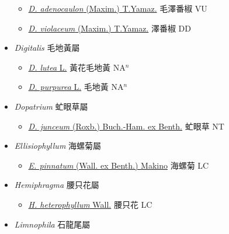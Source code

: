 \begin{itemize}
  \begin{itemize}
        \item[] \href{http://www.theplantlist.org/tpl1.1/search?q=Deinostema+adenocaulon}{\textit{D. adenocaulon} (Maxim.) T.Yamaz.}   毛澤番椒 VU
        \item[] \href{http://www.theplantlist.org/tpl1.1/search?q=Deinostema+violaceum}{\textit{D. violaceum} (Maxim.) T.Yamaz.}   澤番椒 DD
  \end{itemize}
 \item[] \textit{Digitalis} 毛地黃屬
                    
  \begin{itemize}
        \item[] \href{http://www.theplantlist.org/tpl1.1/search?q=Digitalis+lutea}{\textit{D. lutea} L.}   黃花毛地黃 NA$^n$
        \item[] \href{http://www.theplantlist.org/tpl1.1/search?q=Digitalis+purpurea}{\textit{D. purpurea} L.}   毛地黃 NA$^n$
  \end{itemize}
 \item[] \textit{Dopatrium} 虻眼草屬
                    
  \begin{itemize}
        \item[] \href{http://www.theplantlist.org/tpl1.1/search?q=Dopatrium+junceum}{\textit{D. junceum} (Roxb.) Buch.-Ham. ex Benth.}   虻眼草 NT
  \end{itemize}
 \item[] \textit{Ellisiophyllum} 海螺菊屬
                    
  \begin{itemize}
        \item[] \href{http://www.theplantlist.org/tpl1.1/search?q=Ellisiophyllum+pinnatum}{\textit{E. pinnatum} (Wall. ex Benth.) Makino}   海螺菊 LC
  \end{itemize}
 \item[] \textit{Hemiphragma} 腰只花屬
                    
  \begin{itemize}
        \item[] \href{http://www.theplantlist.org/tpl1.1/search?q=Hemiphragma+heterophyllum}{\textit{H. heterophyllum} Wall.}   腰只花 LC
  \end{itemize}
 \item[] \textit{Limnophila} 石龍尾屬
                    

\end{itemize}
